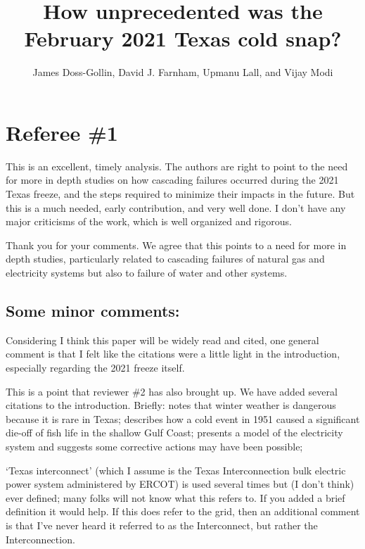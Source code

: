 \documentclass{ar2rc}
\title{How unprecedented was the February 2021 Texas cold snap?}
\author{James Doss-Gollin, David J. Farnham, Upmanu Lall, and Vijay Modi}
\begin{document}
\maketitle

\listoftodos

\section{Referee \#1}

\RC  This is an excellent, timely analysis. The authors are right to point to the need for more in depth studies on how cascading failures occurred during the 2021 Texas freeze, and the steps required to minimize their impacts in the future. But this is a much needed, early contribution, and very well done. I don't have any major criticisms of the work, which is well organized and rigorous.

\AR Thank you for your comments. We agree that this points to a need for more in depth studies, particularly related to cascading failures of natural gas and electricity systems but also to failure of water and other systems.

\subsection{Some minor comments:}

\RC Considering I think this paper will be widely read and cited, one general comment is that I felt like the citations were a little light in the introduction, especially regarding the 2021 freeze itself.

\AR This is a point that reviewer \#2 has also brought up. We have added several citations to the introduction. Briefly: \citet{nielsen-gammon_txacc:2011} notes that winter weather is dangerous because it is rare in Texas; \citet{gunter_fishes:1951} describes how a cold event in 1951 caused a significant die-off of fish life in the shallow Gulf Coast; \citet{wu_tx:2021} presents a model of the electricity system and suggests some corrective actions may have been possible;

\RC `Texas interconnect' (which I assume is the Texas Interconnection bulk electric power system administered by ERCOT) is used several times but (I don't think) ever defined; many folks will not know what this refers to. If you added a brief definition it would help. If this does refer to the grid, then an additional comment is that I've never heard it referred to as the Interconnect, but rather the Interconnection.
\end{document}
